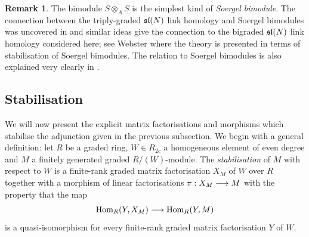 \documentclass{compositio}
\theoremstyle{definition}
\newtheorem{remark}[theorem]{Remark}
\numberwithin{equation}{section}
\def\Hom{\operatorname{Hom}}
\begin{document}
\begin{remark} The bimodule $S \otimes_A S$ is the simplest kind of \emph{Soergel bimodule}. The connection between the triply-graded $\mathfrak{sl}(N)$ link homology and Soergel bimodules was uncovered in \cite{k0510265} and similar ideas give the connection to the bigraded $\mathfrak{sl}(N)$ link homology considered here; see Webster \cite[Section 2.3]{w0610650} where the theory is presented in terms of stabilisation of Soergel bimodules. The relation to Soergel bimodules is also explained very clearly in \cite{b1105.0702}.
\end{remark}


\subsection{Stabilisation}\label{section:stabilisation}

We will now present the explicit matrix factorisations and morphisms which stabilise the adjunction given in the previous subsection. We begin with a general definition: let $R$ be a graded ring, $W \in R_{2c}$ a homogeneous element of even degree and $M$ a finitely generated graded $R/(W)$-module. The \emph{stabilisation} of $M$ with respect to $W$ is a finite-rank graded matrix factorisation $X_M$ of $W$ over $R$ together with a morphism of linear factorisations $\pi: X_M \longrightarrow M$ with the property that the map
\[
\Hom_R(Y, X_M) \lto \Hom_R(Y, M)
\]
is a quasi-isomorphism for every finite-rank graded matrix factorisation $Y$ of $W$.

\end{document}

